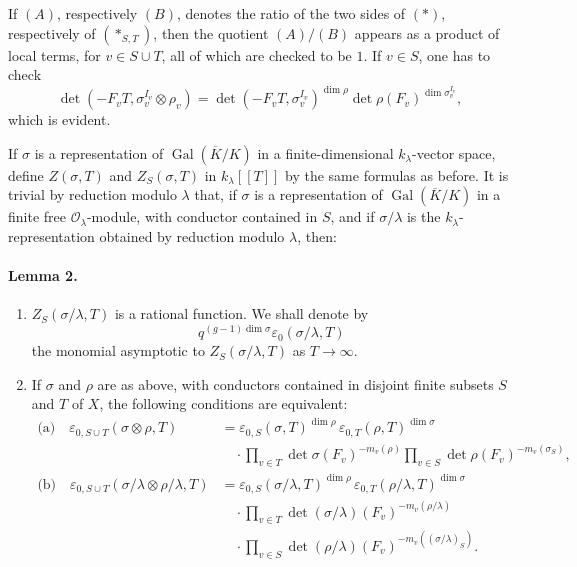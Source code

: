 \documentclass[11pt]{article}
\newcommand{\Gal}{\operatorname{Gal}}
\newcommand{\dimn}{\operatorname{dim}}
\newcommand{\eps}{\varepsilon}
\newcommand{\cO}{\mathcal O}
\begin{document}
If $(A)$, respectively $(B)$, denotes the ratio of the two sides of $(*)$, respectively of $(*_{S,T})$, then the quotient $(A)/(B)$ appears as a product of local terms, for $v\in S\cup T$, all of which are checked to be $1$. If $v\in S$, one has to check
\[
 \det(-F_vT,\sigma_v^{I_v}\otimes\rho_v)
 =\det(-F_vT,\sigma_v^{I_v})^{\dimn\rho}
   \det\rho(F_v)^{\dimn\sigma_v^{I_v}},
\]
which is evident.

If $\sigma$ is a representation of $\Gal(\overline K/K)$ in a finite-dimensional $k_\lambda$-vector space, define $Z(\sigma,T)$ and $Z_S(\sigma,T)$ in $k_\lambda[[T]]$ by the same formulas as before. It is trivial by reduction modulo $\lambda$ that, if $\sigma$ is a representation of $\Gal(\overline K/K)$ in a finite free $\cO_\lambda$-module, with conductor contained in $S$, and if $\sigma/\lambda$ is the $k_\lambda$-representation obtained by reduction modulo $\lambda$, then:

\paragraph{Lemma 2.}
\begin{enumerate}[label=(\roman*)]
\item $Z_S(\sigma/\lambda,T)$ is a rational function. We shall denote by
\[
 q^{(g-1)\dimn\sigma}\eps_0(\sigma/\lambda,T)
\]
the monomial asymptotic to $Z_S(\sigma/\lambda,T)$ as $T\to\infty$.

\item If $\sigma$ and $\rho$ are as above, with conductors contained in disjoint finite subsets $S$ and $T$ of $X$, the following conditions are equivalent:
\begin{align*}
\text{(a)}\quad
\eps_{0,S\cup T}(\sigma\otimes\rho,T)
&=\eps_{0,S}(\sigma,T)^{\dimn\rho}\,
  \eps_{0,T}(\rho,T)^{\dimn\sigma}\\
&\quad\cdot
\prod_{v\in T}\det\sigma(F_v)^{-m_v(\rho)}
\prod_{v\in S}\det\rho(F_v)^{-m_v(\sigma_S)},\\[0.5em]
\text{(b)}\quad
\eps_{0,S\cup T}(\sigma/\lambda\otimes\rho/\lambda,T)
&=\eps_{0,S}(\sigma/\lambda,T)^{\dimn\rho}\,
  \eps_{0,T}(\rho/\lambda,T)^{\dimn\sigma}\\
&\quad\cdot
\prod_{v\in T}\det(\sigma/\lambda)(F_v)^{-m_v(\rho/\lambda)}\\
&\quad\cdot
\prod_{v\in S}\det(\rho/\lambda)(F_v)^{-m_v((\sigma/\lambda)_S)} .
\end{align*}
\end{enumerate}
\end{document}
